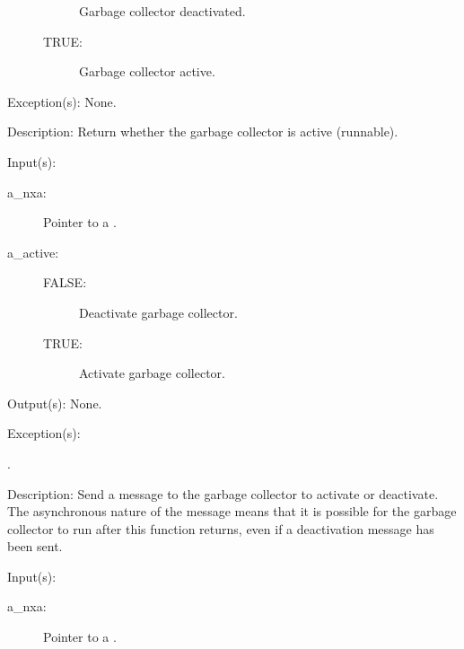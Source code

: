 \begin{capi}
\begin{capilist}
\begin{description}
\begin{description}
				Garbage collector deactivated.
			\item[TRUE: ]
				Garbage collector active.
			\end{description}
		\end{description}
	\item[Exception(s): ] None.
	\item[Description: ]
		Return whether the garbage collector is active (runnable).
	\end{capilist}
\label{nxa_active_set}
	\begin{capilist}
	\item[Input(s): ]
		\begin{description}\item[]
		\item[a\_nxa: ]
			Pointer to a .
		\item[a\_active: ]
			\begin{description}\item[]
			\item[FALSE: ]
				Deactivate garbage collector.
			\item[TRUE: ]
				Activate garbage collector.
			\end{description}
		\end{description}
	\item[Output(s): ] None.
	\item[Exception(s): ]
		\begin{description}\item[]
		\item[.]
		\end{description}
	\item[Description: ]
		Send a message to the garbage collector to activate or
		deactivate.  The asynchronous nature of the message means that
		it is possible for the garbage collector to run after this
		function returns, even if a deactivation message has been sent.
	\end{capilist}
\label{nxa_period_get}
	\begin{capilist}
	\item[Input(s): ]
		\begin{description}\item[]
		\item[a\_nxa: ]
			Pointer to a \classname{nxa}.

\end{description}
\end{capilist}
\end{capi}

